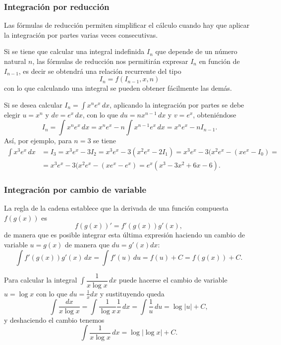 \begin{frame}
\frametitle{Integración por reducción}
Las fórmulas de reducción permiten simplificar el cálculo cuando hay que aplicar la integración por partes varias veces consecutivas.

Si se tiene que calcular una integral indefinida $I_{n}$ que depende de un número natural $n$, las fórmulas de reducción nos permitirán expresar $I_{n}$ en función de $I_{n-1}$, es decir se obtendrá una relación recurrente del tipo
\[
\ I_{n}=f(I_{n-1},x,n)
\]
con lo que calculando una integral se pueden obtener fácilmente las demás.

 Si se desea calcular $I_{n}=\int{x^{n}e^{x}}\,dx$, aplicando la integración por partes se debe elegir $u=x^{n}$ y $dv=e^{x}\,dx$, con lo que $du=nx^{n-1}\,dx$ y $v=e^{x}$, obteniéndose
\[
\ I_{n}=\int{x^{n}e^{x}}\,dx=x^{n}e^{x}-n\int{x^{n-1}e^{x}}\,dx=x^{n}e^{x}-nI_{n-1}.
\]
Así, por ejemplo, para $n=3$ se tiene
\begin{align*}
\int x^3 e^x\, dx &= I_3 = x^3e^x-3I_2 = x^3e^x-3(x^2e^x-2I_1) = x^3e^x-3(x^2e^x-(xe^x-I_0) =\\
&= x^3e^x-3(x^2e^x-(xe^x-e^x) = e^x(x^3-3x^2+6x-6).
\end{align*}
\end{frame}


\begin{frame}
\frametitle{Integración por cambio de variable}
La regla de la cadena establece que la derivada de una función compuesta $f(g(x))$ es
\[
f(g(x))' = f'(g(x))g'(x),
\]
de manera que es posible integrar esta última expresión haciendo un cambio de variable $u=g(x)$ de manera que
$du=g'(x)dx$:
\[
\int f'(g(x))g'(x)\, dx = \int f'(u)\, du = f(u)+C = f(g(x))+C.
\]

 Para calcular la integral $\int{\dfrac{1}{x\log x}}\, dx$
puede hacerse el cambio de variable $u=\log x$ con lo que $du=\frac{1}{x}dx$ y sustituyendo queda
\[
\int \frac{dx}{x\log x}=\int \frac{1}{\log x}\frac{1}{x}\,dx = \int \frac{1}{u}\,du = \log |u|+ C,
\]
y deshaciendo el cambio tenemos
\[
\int \frac{1}{x\log x}\,dx= \log |\log x| + C.
\]
\end{frame}



